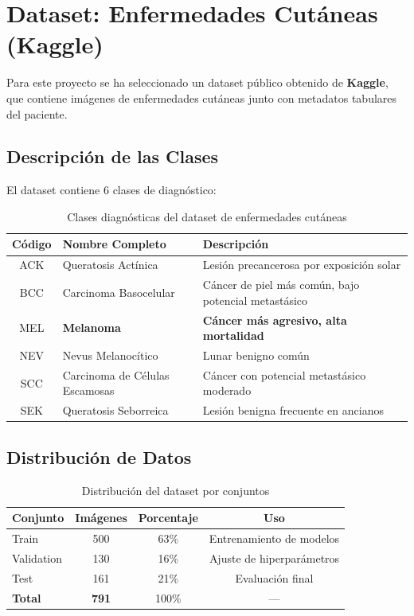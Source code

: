 \documentclass[12pt,a4paper]{article}
\begin{document}
\newpage

\section{Dataset: Enfermedades Cutáneas (Kaggle)}

Para este proyecto se ha seleccionado un dataset público obtenido de \textbf{Kaggle}, que contiene imágenes de enfermedades cutáneas junto con metadatos tabulares del paciente.

\subsection{Descripción de las Clases}

El dataset contiene 6 clases de diagnóstico:

\begin{table}[H]
\centering
\begin{tabular}{clp{8cm}}
\toprule
\textbf{Código} & \textbf{Nombre Completo} & \textbf{Descripción} \\
\midrule
ACK & Queratosis Actínica & Lesión precancerosa por exposición solar \\
BCC & Carcinoma Basocelular & Cáncer de piel más común, bajo potencial metastásico \\
\rowcolor{red!15} MEL & \textbf{Melanoma} & \textbf{Cáncer más agresivo, alta mortalidad} \\
NEV & Nevus Melanocítico & Lunar benigno común \\
SCC & Carcinoma de Células Escamosas & Cáncer con potencial metastásico moderado \\
SEK & Queratosis Seborreica & Lesión benigna frecuente en ancianos \\
\bottomrule
\end{tabular}
\caption{Clases diagnósticas del dataset de enfermedades cutáneas}
\end{table}

\subsection{Distribución de Datos}

\begin{table}[H]
\centering
\begin{tabular}{lccc}
\toprule
\textbf{Conjunto} & \textbf{Imágenes} & \textbf{Porcentaje} & \textbf{Uso} \\
\midrule
Train & 500 & 63\% & Entrenamiento de modelos \\
Validation & 130 & 16\% & Ajuste de hiperparámetros \\
Test & 161 & 21\% & Evaluación final \\
\midrule
\textbf{Total} & \textbf{791} & 100\% & --- \\
\bottomrule
\end{tabular}
\caption{Distribución del dataset por conjuntos}
\end{table}
\end{document}
